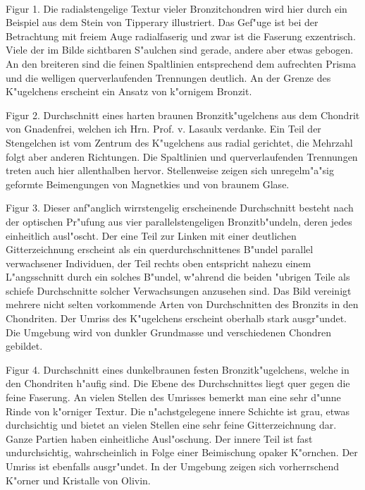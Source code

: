 \documentclass[a4paper, 11pt, oneside, polutonikogreek, german]{article}
\begin{document}
\paragraph{}
Figur 1. Die radialstengelige Textur vieler Bronzitchondren wird hier durch ein Beispiel aus dem Stein von Tipperary illustriert. Das Gef"uge ist bei der Betrachtung mit freiem Auge radialfaserig und zwar ist die Faserung exzentrisch. Viele der im Bilde sichtbaren S"aulchen sind gerade, andere aber etwas gebogen. An den breiteren sind die feinen Spaltlinien entsprechend dem aufrechten Prisma und die welligen querverlaufenden Trennungen deutlich. An der Grenze des K"ugelchens erscheint ein Ansatz von k"ornigem Bronzit.

Figur 2. Durchschnitt eines harten braunen Bronzitk"ugelchens aus dem Chondrit von Gnadenfrei, welchen ich Hrn. Prof. v. Lasaulx verdanke. Ein Teil der Stengelchen ist vom Zentrum des K"ugelchens aus radial gerichtet, die Mehrzahl folgt aber anderen Richtungen. Die Spaltlinien und querverlaufenden Trennungen treten auch hier allenthalben hervor. Stellenweise zeigen sich unregelm"a"sig geformte Beimengungen von Magnetkies und von braunem Glase.

Figur 3. Dieser anf"anglich wirrstengelig erscheinende Durchschnitt besteht nach der optischen Pr"ufung aus vier parallelstengeligen Bronzitb"undeln, deren jedes einheitlich ausl"oscht. Der eine Teil zur Linken mit einer deutlichen Gitterzeichnung erscheint als ein querdurchschnittenes B"undel parallel verwachsener Individuen, der Teil rechts oben entspricht nahezu einem L"angsschnitt durch ein solches B"undel, w"ahrend die beiden "ubrigen Teile als schiefe Durchschnitte solcher Verwachsungen anzusehen sind. Das Bild vereinigt mehrere nicht selten vorkommende Arten von Durchschnitten des Bronzits in den Chondriten. Der Umriss des K"ugelchens erscheint oberhalb stark ausgr"undet. Die Umgebung wird von dunkler Grundmasse und verschiedenen Chondren gebildet.

Figur 4. Durchschnitt eines dunkelbraunen festen Bronzitk"ugelchens, welche in den Chondriten h"aufig sind. Die Ebene des Durchschnittes liegt quer gegen die feine Faserung. An vielen Stellen des Umrisses bemerkt man eine sehr d"unne Rinde von k"orniger Textur. Die n"achstgelegene innere Schichte ist grau, etwas durchsichtig und bietet an vielen Stellen eine sehr feine Gitterzeichnung dar. Ganze Partien haben einheitliche Ausl"oschung. Der innere Teil ist fast undurchsichtig, wahrscheinlich in Folge einer Beimischung opaker K"ornchen. Der Umriss ist ebenfalls ausgr"undet. In der Umgebung zeigen sich vorherrschend K"orner und Kristalle von Olivin.
\clearpage
\end{document}
